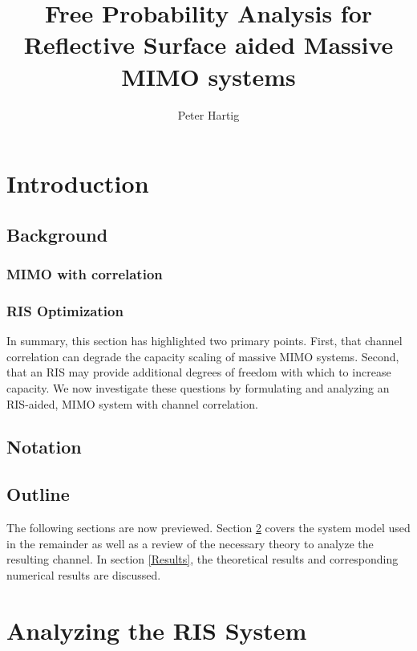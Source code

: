 \documentclass[12pt,a4paper]{report}
\title{Free Probability Analysis for Reflective Surface aided Massive MIMO systems}
\author{Peter Hartig}
\begin{document}
\maketitle
\begin{abstract}

\end{abstract}
%
\tableofcontents
\chapter{Introduction}
\section{Background}\label{Background}

\par
\subsection{MIMO with correlation}\label{mimo_corr}

\par
\subsection{RIS Optimization}\label{irs_opt}

\par
In summary, this section has highlighted two primary points. First, that channel correlation can degrade the capacity scaling of massive MIMO systems. Second, that an RIS may provide additional degrees of freedom with which to increase capacity. We now investigate these questions by formulating and analyzing an RIS-aided, MIMO system with channel correlation. 
\section{Notation}

\section{Outline}
The following sections are now previewed. Section \ref{system_model} covers the system model used in the remainder as well as a review of the necessary theory to analyze the resulting channel. In section \ref{Results}, the theoretical results and corresponding numerical results are discussed. 

\chapter{Analyzing the RIS System}\label{system_model}
\end{document}

